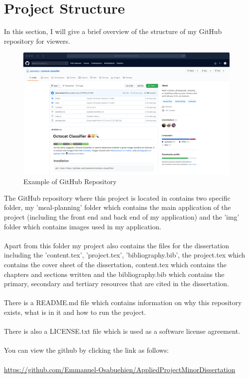\section {Project Structure}

In this section, I will give a brief overview of the structure of my GitHub repository for viewers.
\begin{figure}[H]
  \includegraphics[scale=0.15]{img/githubpic.png}
  \centering
  \caption{Example of GitHub Repository}
  \label{fig: GitHub Repo Example}
\end{figure}
The GitHub repository where this project is located in contains two specific folder, my 'meal-planning' folder which contains the main application of the project (including the front end and back end of my application) and the 'img' folder which contains images used in my application. \\ \\
Apart from this folder my project also contains the files for the dissertation including the 'content.tex', 'project.tex', 'bibliography.bib', the project.tex which contains the cover sheet of the dissertation, content.tex which contains the chapters and sections written and the bibliography.bib which contains the primary, secondary and tertiary resources that are cited in the dissertation. \\ \\ 
There is a README.md file which contains information on why this repository exists, what is in it and how to run the project.  \\  \\
There is also a LICENSE.txt file which is used as a software license agreement. \\ \\
You can view the github by clicking the link as follows: \\  \\ \url{https://github.com/Emmanuel-Osabuehien/AppliedProjectMinorDissertation}

